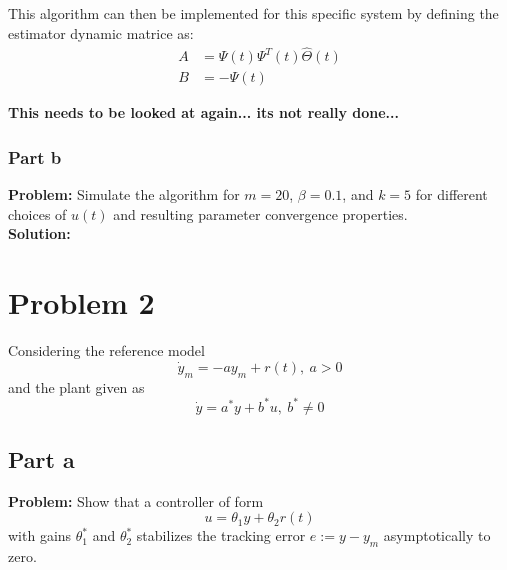 \documentclass[letter]{article}
\begin{document}
This algorithm can then be implemented for this specific system by defining the estimator dynamic matrice as:
\begin{equation}
	\begin{aligned}
		A &= \Psi(t) \Psi^T(t) \hat{\Theta}(t)\\
		B &= - \Psi(t)
	\end{aligned}
\end{equation}

\textbf{This needs to be looked at again... its not really done...}


\subsubsection{Part b}
\textbf{Problem:}
Simulate the algorithm for $m = 20$, $\beta = 0.1$, and $k = 5$ for different choices of $u(t)$ and resulting parameter convergence properties.\\

\noindent
\textbf{Solution:}







\newpage
\section{Problem 2}
Considering the reference model
\begin{equation}
	\dot{y}_m = -a y_m + r(t), \ a>0
\end{equation}
and the plant given as
\begin{equation}
	\dot{y} = a^*y + b^* u, \ b^* \neq 0
\end{equation}

\subsection{Part a}
\textbf{Problem:}
Show that a controller of form $$u = \theta_1 y + \theta_2 r(t)$$ with gains $\theta^*_1$ and $\theta^*_2$ stabilizes the tracking error $e:= y-y_m$ asymptotically to zero.\\
\end{document}
